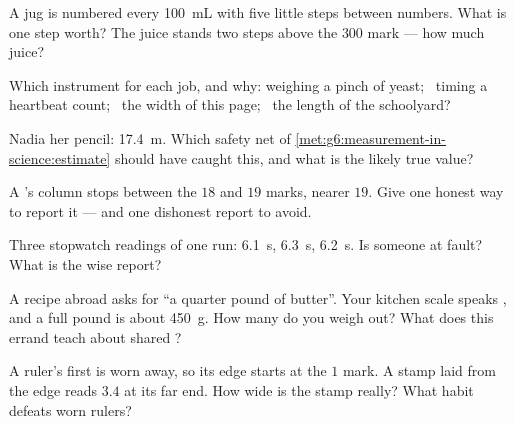 \begin{exercise}[$\star$]\label{exo:g6:measurement-in-science:4}
A jug is numbered every \qty{100}{mL} with five little steps
between numbers. What is one step worth? The juice stands two
steps above the $300$ mark --- how much juice?
\end{exercise}

\begin{exercise}[$\star$]\label{exo:g6:measurement-in-science:5}
Which instrument for each job, and why: weighing a pinch of
yeast; \ timing a heartbeat count; \ the width of this page; \ the
length of the schoolyard?
\end{exercise}

\begin{exercise}[$\star$]\label{exo:g6:measurement-in-science:6}
Nadia  her pencil: \qty{17.4}{m}. Which safety net of
\cref{met:g6:measurement-in-science:estimate} should have caught
this, and what is the likely true value?
\end{exercise}

\begin{exercise}[$\star$]\label{exo:g6:measurement-in-science:7}
A 's column stops between the $18$ and $19$ marks,
nearer $19$. Give one honest way to report it --- and one
dishonest report to avoid.
\end{exercise}

\begin{exercise}[$\star$]\label{exo:g6:measurement-in-science:8}
Three stopwatch readings of one run: \qty{6.1}{s}, \qty{6.3}{s},
\qty{6.2}{s}. Is someone at fault? What is the wise report?
\end{exercise}

\begin{exercise}[$\star\star$]\label{exo:g6:measurement-in-science:9}
A recipe abroad asks for ``a quarter pound of butter''. Your
kitchen scale speaks , and a full pound is about
\qty{450}{g}. How many  do you weigh out? What does this
errand teach about shared ?
\end{exercise}

\begin{exercise}[$\star\star$]\label{exo:g6:measurement-in-science:10}
A ruler's first  is worn away, so its edge starts at the
$1$ mark. A stamp laid from the edge reads $3.4$ at its far end.
How wide is the stamp really? What habit defeats worn rulers?
\end{exercise}

